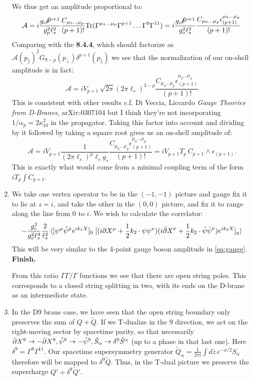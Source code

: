\documentclass[11pt, class=article, crop=false]{standalone}
\begin{document}
\begin{enumerate}
	We thus get an amplitude proportional to:
	\[
		\mathcal A = i \frac{g_c \cancel\delta^{p+1}}{g_p^2 \ell_s^2} \frac{C_{\mu_0 \dots \mu_p}}{(p+1)!} \mathrm{Tr}(\Gamma^{\mu_1 \dots \mu_p} \Gamma^{p+1} \dots \Gamma^9 \Gamma^{11}) = i \frac{g_c \cancel\delta^{p+1}}{g_o^2 \ell_s^2} \frac{C_{\mu_0 \dots \mu_p} \epsilon_{(p+1)}^{\mu_0 \dots \mu_p}}{(p+1)!} 
	\]
	Comparing with the \textbf{8.4.4}, which should factorize as $\mathcal A(p_\parallel)^2 G_{9-p}(p_\perp) \delta^{p+1}(p_\parallel)$ we see that the normalization of our on-shell amplitude is in fact:
	\[
		\mathcal A = i V_{p+1} \, \sqrt{2 \pi} (2\pi \ell_s)^{3-p} \frac{C_{\mu_0 \dots \mu_p} \epsilon_{(p+1)}^{\mu_0 \dots \mu_p}}{(p+1)!} 
	\]
	This is consistent with other results c.f. Di Veccia, Liccardo \emph{Gauge Theories from D-Branes}, arXiv:0307104 but I think they're not incorporating $1/\alpha_p = 2 \kappa_{10}^2$ in the propagator. Taking this factor into account and dividing by it followed by taking a square root gives us an on-shell amplitude of:
	\[
		\mathcal A = i V_{p+1} \frac{1}{(2 \pi \ell_s)^p \ell_s g_s} \frac{C_{\mu_0 \dots \mu_p} \epsilon_{(p+1)}^{\mu_0 \dots \mu_p}}{(p+1)!}  = i V_{p+1} T_p \, C_{p+1} \wedge \epsilon_{(p+1)}.
	\]
	This is exactly what would come from a minimal coupling term of the form $i T_p \int C_{p+1}$.
	
	\item We take one vertex operator to be in the $(-1, -1)$ picture and gauge fix it to lie at $z=i$, and take the other in the $(0, 0)$ picture, and fix it to range along the line from $0$ to $i$. We wish to calculate the correlator:
	\[
		-\frac{g_c^2}{g_o^2 \ell_s^4} \frac{2}{\ell_s^2} \braket{[\psi^\mu \tilde \psi^{\bar \mu} e^{i k_1 X}]_0\; [(i \partial X^\mu + \frac12 k_2 \cdot \psi \psi^\nu) (i \bar {\partial} X^{\bar \nu} + \frac12 k_2 \cdot \bar \psi \bar \psi^{\bar \nu}) e^{i k_2 X}]_y }
	\]
	This will be very similar to the 4-point gauge boson amplitude in \eqref{eq:gauge}. \textbf{Finish.}
	
	
	From this ratio $\Gamma \Gamma/\Gamma$ functions we see that there are open string poles. This corresponds to a closed string splitting in two, with its ends on the D-brane as an intermediate state.
	
	\item In the D9 brane case, we have seen that the open string boundary only preserves the sum of $Q + \tilde Q$. If we T-dualize in the 9 direction, we act on the right-moving sector by spacetime parity, so that necessarily $\bar {\partial} X^9 \to - \bar {\partial} X^9, \tilde \psi^9 \to - \tilde \psi^9, \tilde S_\alpha \to \delta^9 \tilde S^\alpha$ (up to a phase in that last one). Here $\delta^9 = \Gamma^9 \Gamma^{11}$. Our spacetime supersymmetry generator $\tilde Q_\alpha = \frac{1}{2\pi i} \int d\bar z\, e^{-\phi/2} S_{\alpha}$ therefore will be mapped to $\delta^9 \tilde Q$. Thus, in the T-dual picture we preserve the supercharge $Q' + \delta^9 \tilde Q'$.
	

\end{enumerate}
\end{document}
